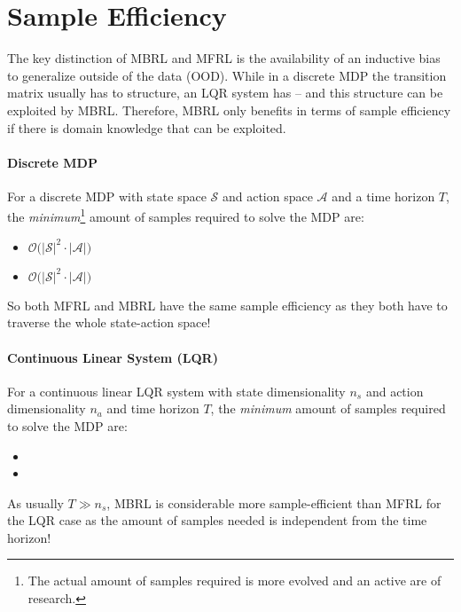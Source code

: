 	\section{Sample Efficiency}
		The key distinction of MBRL and MFRL is the availability of an inductive bias to generalize outside of the data (OOD). While in a discrete MDP the transition matrix usually has to structure, an LQR system has -- and this structure can be exploited by MBRL. Therefore, MBRL only benefits in terms of sample efficiency if there is domain knowledge that can be exploited.

		\paragraph{Discrete MDP}
			For a discrete MDP with state space \(\mathcal{S}\) and action space \(\mathcal{A}\) and a time horizon \(T\), the \emph{minimum}\footnote{The actual amount of samples required is more evolved and an active are of research.} amount of samples required to solve the MDP are:
			\begin{itemize}
				\item {}
					\( \mathcal{O}\big( \lvert \mathcal{S} \rvert^2 \cdot \lvert \mathcal{A} \rvert \big) \)
				\item {}
					\( \mathcal{O}\big( \lvert \mathcal{S} \rvert^2 \cdot \lvert \mathcal{A} \rvert \big) \)
			\end{itemize}
			So both MFRL and MBRL have the same sample efficiency as they both have to traverse the whole state-action space!

		\paragraph{Continuous Linear System (LQR)}
			For a continuous linear LQR system with state dimensionality \(n_s\) and action dimensionality \(n_a\) and time horizon \(T\), the \emph{minimum} amount of samples required to solve the MDP are:
			\begin{itemize}
				\item {}
					 
				\item {}
					   
			\end{itemize}
			As usually \( T \gg n_s \), MBRL is considerable more sample-efficient than MFRL for the LQR case as the amount of samples needed is independent from the time horizon!

